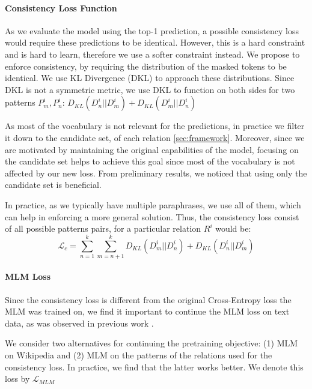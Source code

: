 \paragraph{Consistency Loss Function}
As we evaluate the model using the top-1 prediction, a possible consistency loss would require these predictions to be identical. However, this is a hard constraint and is hard to learn, therefore we use a softer constraint instead.
We propose to enforce consistency, by requiring the distribution of the masked tokens to be identical. We use KL Divergence (DKL) to approach these distributions. Since DKL is not a symmetric metric, we use DKL to function on both sides for two patterns $P^i_m,P^i_n$:
$D_{KL}(D^i_n||D^i_m) + D_{KL} (D^i_m||D^i_n)$

As most of the vocabulary is not relevant for the
predictions, in practice we filter it down to the candidate set, of each relation \ref{sec:framework}. Moreover, since we are motivated by maintaining the original capabilities of the model, focusing on the candidate set helps to achieve this goal since most of the vocabulary is not affected by our new loss.
From preliminary results, we noticed that using only the candidate set is beneficial.

In practice, as we typically have multiple paraphrases, we use all of them, which can help in enforcing a more general solution. Thus, the consistency loss consist of all possible patterns pairs, for a particular relation $R^i$ would be:
\[
\mathcal{L}_{c} = \sum_{n=1}^k \sum_{m=n+1}^k D_{KL}(D^i_m||D^i_n) + D_{KL}(D^i_n||D^i_m)
\]


\paragraph{MLM Loss}
Since the consistency loss is different from the original Cross-Entropy loss the MLM was trained on, we find it important to continue the MLM loss on text data, as was observed in previous work \cite{geva2020injecting}.

We consider two alternatives for continuing the pretraining objective: (1) MLM on Wikipedia and (2) MLM on the patterns of the relations used for the consistency loss. In practice, we find that the latter works better. We denote this loss by $\mathcal{L}_{MLM}$


